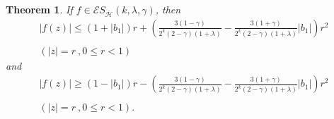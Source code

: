 \documentclass[12pt,reqno]{amsart}
\newtheorem{theorem}{Theorem}
\begin{document}
\begin{theorem}
If $f\in \mathcal{E}S_{\overline{\mathcal{H}}}(k,\lambda ,\gamma )$, then%
\begin{equation*}
\begin{array}{c}
\left\vert f(z)\right\vert \leq \left( 1+\left\vert b_{1}\right\vert \right)
r+\left( \frac{3(1-\gamma )}{2^{k}(2-\gamma )(1+\lambda )}-\frac{3(1+\gamma )%
}{2^{k}(2-\gamma )(1+\lambda )}\left\vert b_{1}\right\vert \right) r^{2} \\ 
\\ 
\left( \left\vert z\right\vert =r~,0\leq r<1\right) 
\end{array}%
\end{equation*}%
and%
\begin{equation*}
\begin{array}{c}
\left\vert f(z)\right\vert \geq \left( 1-\left\vert b_{1}\right\vert \right)
r-\left( \frac{3(1-\gamma )}{2^{k}(2-\gamma )(1+\lambda )}-\frac{3(1+\gamma )%
}{2^{k}(2-\gamma )(1+\lambda )}\left\vert b_{1}\right\vert \right) r^{2} \\ 
\\ 
\left( \left\vert z\right\vert =r~,0\leq r<1\right) .%
\end{array}%
\end{equation*}
\end{theorem}
\end{document}
